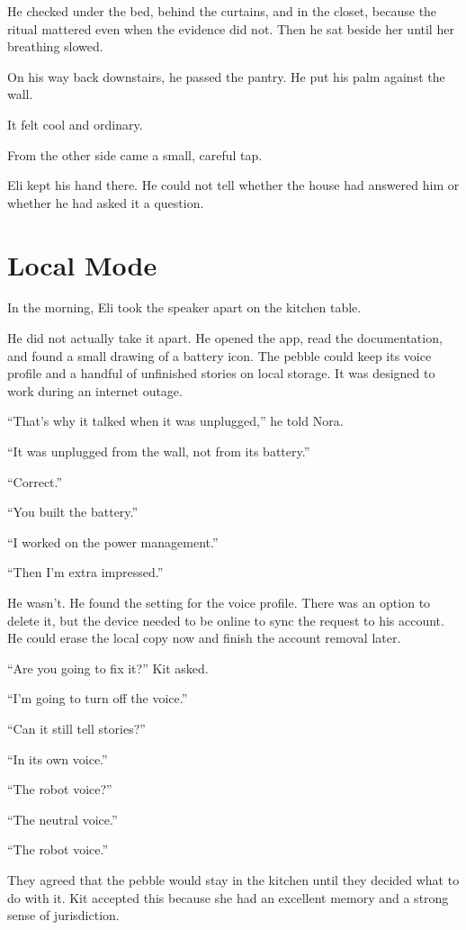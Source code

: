 \documentclass[11pt,openany]{book}
\begin{document}
He checked under the bed, behind the curtains, and in the closet, because the ritual mattered even when the evidence did not. Then he sat beside her until her breathing slowed.

On his way back downstairs, he passed the pantry. He put his palm against the wall.

It felt cool and ordinary.

From the other side came a small, careful tap.

Eli kept his hand there. He could not tell whether the house had answered him or whether he had asked it a question.

\chapter{Local Mode}

In the morning, Eli took the speaker apart on the kitchen table.

He did not actually take it apart. He opened the app, read the documentation, and found a small drawing of a battery icon. The pebble could keep its voice profile and a handful of unfinished stories on local storage. It was designed to work during an internet outage.

``That's why it talked when it was unplugged,'' he told Nora.

``It was unplugged from the wall, not from its battery.''

``Correct.''

``You built the battery.''

``I worked on the power management.''

``Then I'm extra impressed.''

He wasn't. He found the setting for the voice profile. There was an option to delete it, but the device needed to be online to sync the request to his account. He could erase the local copy now and finish the account removal later.

``Are you going to fix it?'' Kit asked.

``I'm going to turn off the voice.''

``Can it still tell stories?''

``In its own voice.''

``The robot voice?''

``The neutral voice.''

``The robot voice.''

They agreed that the pebble would stay in the kitchen until they decided what to do with it. Kit accepted this because she had an excellent memory and a strong sense of jurisdiction.
\end{document}
